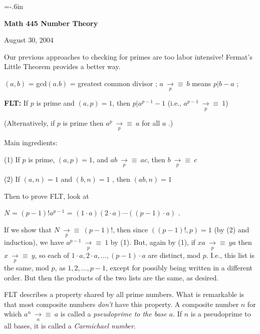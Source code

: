 

\loadmsbm

\nopagenumbers
\parindent=0pt
\voffset=-.6in


\def\ctln{\centerline}
\def\u{\underbar}
\def\zzz{{\Bbb Z}}
\def\modp{\medspace {\underset p\to \equiv} \medspace}
\def\modn{\medspace {\underset n\to \equiv} \medspace}

\ctln{\bf Math 445 Number Theory}

\medskip

\ctln{August 30, 2004}

\bigskip

Our previous approaches to checking for primes are too labor 
intensive! Fermat's Little Theorem provides a better way.

\medskip

$(a,b)$ = gcd$(a.b)$ = greatest common divisor ; $a\modp b$ means $p|b-a$ ; 

\medskip

{\bf FLT:} If $p$ is prime and $(a,p)=1$, then $p|a^{p-1}-1$  (i.e., $a^{p-1} \modp 1$)

\smallskip

(Alternatively, if $p$ is prime then $a^p\modp a$ for all $a$  .)

\medskip

Main ingredients:

\smallskip

(1) If $p$ is prime, $(a,p)=1$, and $ab\modp ac$, then $b\modp c$

\smallskip

(2) If  $(a,n) = 1$ and $(b,n) = 1$ , then $(ab,n)=1$

\medskip

Then to prove FLT, look at 

\ctln{$N$ = $(p-1)!a^{p-1}$ = $(1\cdot a)(2\cdot a)\cdots((p-1)\cdot a)$ .}
 
If we show that $N\modp (p-1)!$, then since $((p-1)!,p)=1$ (by (2) 
and induction), we have $a^{p-1}\modp 1$ 
by (1). But, again by (1), if $xa\modp ya$ then $x\modp y$, so each of
$1\cdot a, 2\cdot a, \ldots , (p-1)\cdot a$ are distinct, mod $p$. I.e., 
this list is the same, mod $p$, 
as $1,2,\ldots ,p-1$, except for possibly being written in a different order. 
But then the products of the two lists are the 
same, as desired.

\bigskip

FLT describes a property shared by all prime numbers. What is remarkable is that most
composite numbers {\it don't} have this property. A composite number $n$  for which
$a^n\modn a$ is called a {\it pseudoprime to the base $a$}. If $n$ is a pseudoprime to
all bases, it is called a {\it Carmichael number}.

